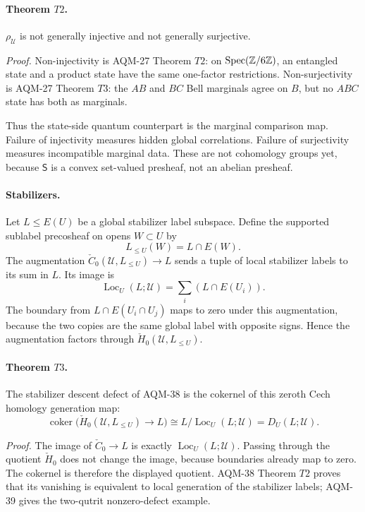\paragraph{Theorem \(T2\).}
\(\rho_{\mathcal U}\) is not generally injective and not generally
surjective.

\emph{Proof.}
Non-injectivity is AQM-27 Theorem \(T2\): on
\(\operatorname{Spec}(\mathbb Z/6\mathbb Z)\), an entangled state and a product state have
the same one-factor restrictions.  Non-surjectivity is AQM-27 Theorem \(T3\):
the \(AB\) and \(BC\) Bell marginals agree on \(B\), but no \(ABC\) state has
both as marginals.

Thus the state-side quantum counterpart is the marginal comparison map.
Failure of injectivity measures hidden global correlations.  Failure of
surjectivity measures incompatible marginal data.  These are not cohomology
groups yet, because \(\mathsf S\) is a convex set-valued presheaf, not an
abelian presheaf.

\paragraph{Stabilizers.}
Let \(L\leq E(U)\) be a global stabilizer label subspace.  Define the
supported sublabel precosheaf on opens \(W\subset U\) by
\[
  L_{\leq U}(W)=L\cap E(W).
\]
The augmentation \(\check C_0(\mathcal U,L_{\leq U})\to L\) sends a tuple of
local stabilizer labels to its sum in \(L\).  Its image is
\[
  \operatorname{Loc}_U(L;\mathcal U)
  =
  \sum_i(L\cap E(U_i)).
\]
The boundary from \(L\cap E(U_i\cap U_j)\) maps to zero under this
augmentation, because the two copies are the same global label with opposite
signs.  Hence the augmentation factors through
\(\check H_0(\mathcal U,L_{\leq U})\).

\paragraph{Theorem \(T3\).}
The stabilizer descent defect of AQM-38 is the cokernel of this zeroth Cech
homology generation map:
\[
  \operatorname{coker}\bigl(
  \check H_0(\mathcal U,L_{\leq U})\to L
  \bigr)
  \cong
  L/\operatorname{Loc}_U(L;\mathcal U)
  =
  D_U(L;\mathcal U).
\]

\emph{Proof.}
The image of \(\check C_0\to L\) is exactly
\(\operatorname{Loc}_U(L;\mathcal U)\).  Passing through the quotient
\(\check H_0\) does not change the image, because boundaries already map to
zero.  The cokernel is therefore the displayed quotient.  AQM-38 Theorem
\(T2\) proves that its vanishing is equivalent to local generation of the
stabilizer labels; AQM-39 gives the two-qutrit nonzero-defect example.

